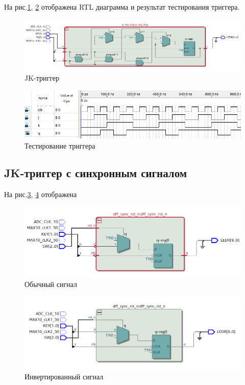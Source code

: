 \documentclass[a4paper,14pt]{article}
\begin{document}

На рис.\ref{fig:6_RTL_jk}, \ref{fig:6_wave_jk} отображена RTL диаграмма и результат тестирования триггера.

\begin{figure}[H]
	\centering
	\includegraphics[width=0.9\linewidth]{imgs/6_RTL_jk}
	\caption{JK-триггер}
	\label{fig:6_RTL_jk}
\end{figure}

\begin{figure}[H]
	\centering
	\includegraphics[width=0.9\linewidth]{imgs/6_wave_jk}
	\caption{Тестирование триггера}
	\label{fig:6_wave_jk}
\end{figure}


\subsection{JK-триггер с синхронным сигналом}

На рис.\ref{fig:7_RTL_sample}, \ref{fig:7_RTL_neinv} отображена

\begin{figure}[H]
	\centering
	\includegraphics[width=0.7\linewidth]{imgs/7_RTL_sample}
	\caption{Обычный сигнал}
	\label{fig:7_RTL_sample}
\end{figure}

\begin{figure}[H]
	\centering
	\includegraphics[width=0.7\linewidth]{imgs/7_RTL_neinv}
	\caption{Инвертированный сигнал}
	\label{fig:7_RTL_neinv}
\end{figure}
\end{document}
